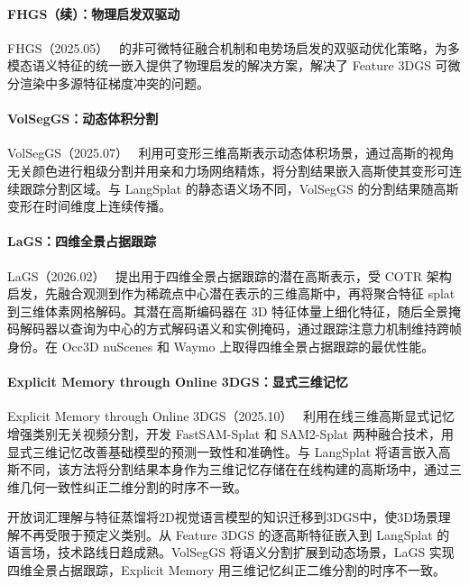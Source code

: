 \paragraph{FHGS（续）：物理启发双驱动} FHGS（2025.05）~\cite{2505_19154} 的非可微特征融合机制和电势场启发的双驱动优化策略，为多模态语义特征的统一嵌入提供了物理启发的解决方案，解决了 Feature 3DGS 可微分渲染中多源特征梯度冲突的问题。

\paragraph{VolSegGS：动态体积分割} VolSegGS（2025.07）~\cite{2507_12667} 利用可变形三维高斯表示动态体积场景，通过高斯的视角无关颜色进行粗级分割并用亲和力场网络精炼，将分割结果嵌入高斯使其变形可连续跟踪分割区域。与 LangSplat 的静态语义场不同，VolSegGS 的分割结果随高斯变形在时间维度上连续传播。

\paragraph{LaGS：四维全景占据跟踪} LaGS（2026.02）~\cite{2602_23172} 提出用于四维全景占据跟踪的潜在高斯表示，受 COTR 架构启发，先融合观测到作为稀疏点中心潜在表示的三维高斯中，再将聚合特征 splat 到三维体素网格解码。其潜在高斯编码器在 3D 特征体量上细化特征，随后全景掩码解码器以查询为中心的方式解码语义和实例掩码，通过跟踪注意力机制维持跨帧身份。在 Occ3D nuScenes 和 Waymo 上取得四维全景占据跟踪的最优性能。

\paragraph{Explicit Memory through Online 3DGS：显式三维记忆} Explicit Memory through Online 3DGS（2025.10）~\cite{2510_23521} 利用在线三维高斯显式记忆增强类别无关视频分割，开发 FastSAM-Splat 和 SAM2-Splat 两种融合技术，用显式三维记忆改善基础模型的预测一致性和准确性。与 LangSplat 将语言嵌入高斯不同，该方法将分割结果本身作为三维记忆存储在在线构建的高斯场中，通过三维几何一致性纠正二维分割的时序不一致。

\begin{takeaway}
开放词汇理解与特征蒸馏将2D视觉语言模型的知识迁移到3DGS中，使3D场景理解不再受限于预定义类别。从 Feature 3DGS 的逐高斯特征嵌入到 LangSplat 的语言场，技术路线日趋成熟。VolSegGS 将语义分割扩展到动态场景，LaGS 实现四维全景占据跟踪，Explicit Memory 用三维记忆纠正二维分割的时序不一致。
\end{takeaway}

